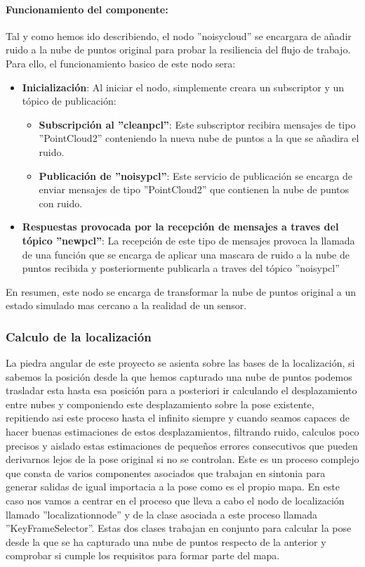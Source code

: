 \documentclass[12pt, a4paper, twoside]{article}
\begin{document}
\paragraph{Funcionamiento del componente:} 
Tal y como hemos ido describiendo, el nodo ''noisy\textunderscore cloud'' se encargara de añadir ruido a la nube de puntos original para probar la resiliencia 
del flujo de trabajo. Para ello, el funcionamiento basico de este nodo sera:
\begin{itemize}
  \item \textbf{Inicialización}: Al iniciar el nodo, simplemente creara un subscriptor y un tópico de publicación:
  \begin{itemize}
    \item \textbf{Subscripción al ''clean\textunderscore pcl''}: Este subscriptor recibira mensajes de tipo ''PointCloud2'' conteniendo la nueva nube de puntos
    a la que se añadira el ruido.
    \item \textbf{Publicación de ''noisy\textunderscore pcl''}: Este servicio de publicación se encarga de enviar mensajes de tipo ''PointCloud2'' que 
    contienen la nube de puntos con ruido. 
  \end{itemize}
  \item \textbf{Respuestas provocada por la recepción de mensajes a traves del tópico ''new\textunderscore pcl''}: La recepción de este tipo de mensajes 
  provoca la llamada de una función que se encarga de aplicar una mascara de ruido a la nube de puntos recibida y posteriormente publicarla a traves del 
  tópico ''noisy\textunderscore pcl''
\end{itemize}
En resumen, este nodo se encarga de transformar la nube de puntos original a un estado simulado mas cercano a la realidad de un sensor.

\subsubsection{Calculo de la localización}
La piedra angular de este proyecto se asienta sobre las bases de la localización, si sabemos la posición desde la que hemos capturado una nube de puntos
podemos trasladar esta hasta esa posición para a posteriori ir calculando el desplazamiento entre nubes y componiendo este desplazamiento sobre la pose
existente, repitiendo asi este proceso hasta el infinito siempre y cuando seamos capaces de hacer buenas estimaciones de estos desplazamientos, filtrando
ruido, calculos poco precisos y aislado estas estimaciones de pequeños errores consecutivos que pueden derivarnos lejos de la pose original si no se 
controlan. \newline
Este es un proceso complejo que consta de varios componentes asociados que trabajan en sintonia para generar salidas de igual importacia a la pose como 
es el propio mapa. En este caso nos vamos a centrar en el proceso que lleva a cabo el nodo de localización llamado ''localization\textunderscore node''
y de la clase asociada a este proceso llamada ''KeyFrameSelector''. Estas dos clases trabajan en conjunto para calcular la pose desde la que se ha capturado 
una nube de puntos respecto de la anterior y comprobar si cumple los requisitos para formar parte del mapa.
\end{document}
